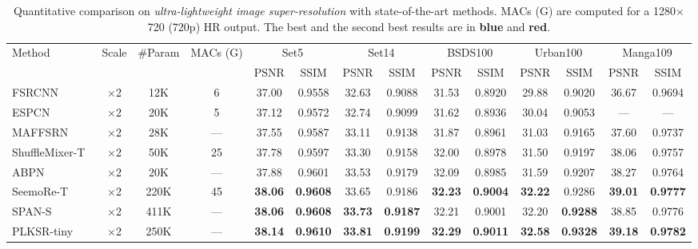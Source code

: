 \documentclass[10pt,twocolumn]{article}
\newcommand{\best}[1]{\textcolor{bestblue}{\textbf{#1}}}
\newcommand{\second}[1]{\textcolor{secondred}{\textbf{#1}}}
\begin{document}
\begin{table}[t]
\centering
\caption{Quantitative comparison on \textit{ultra-lightweight image super-resolution} with state-of-the-art methods.
MACs (G) are computed for a 1280$\times$720 (720p) HR output.
The best and the second best results are in \textcolor{bestblue}{\textbf{blue}} and \textcolor{secondred}{\textbf{red}}.}
\label{tab:sr_comparison}
\setlength{\tabcolsep}{2.5pt}
\footnotesize
\begin{tabular}{lcc c cc cc cc cc cc}
\toprule
\multirow{2}{*}{Method} & \multirow{2}{*}{Scale} & \multirow{2}{*}{\#Param}
  & \multirow{2}{*}{MACs (G)}
  & \multicolumn{2}{c}{Set5}
  & \multicolumn{2}{c}{Set14}
  & \multicolumn{2}{c}{BSDS100}
  & \multicolumn{2}{c}{Urban100}
  & \multicolumn{2}{c}{Manga109} \\
\cmidrule(lr){5-6}\cmidrule(lr){7-8}\cmidrule(lr){9-10}\cmidrule(lr){11-12}\cmidrule(lr){13-14}
 & & & & PSNR & SSIM & PSNR & SSIM & PSNR & SSIM & PSNR & SSIM & PSNR & SSIM \\
\midrule
FSRCNN~\cite{dong2016accelerating}
  & $\times$2 & 12K & 6
  & 37.00 & 0.9558 & 32.63 & 0.9088 & 31.53 & 0.8920 & 29.88 & 0.9020 & 36.67 & 0.9694 \\
ESPCN~\cite{shi2016real}
  & $\times$2 & 20K & 5
  & 37.12 & 0.9572 & 32.74 & 0.9099 & 31.62 & 0.8936 & 30.04 & 0.9053 & ---   & ---    \\
MAFFSRN~\cite{muqeet2020multi}
  & $\times$2 & 28K & ---
  & 37.55 & 0.9587 & 33.11 & 0.9138 & 31.87 & 0.8961 & 31.03 & 0.9165 & 37.60 & 0.9737 \\
ShuffleMixer-T~\cite{sun2023shufflemixer}
  & $\times$2 & 50K & 25
  & 37.78 & 0.9597 & 33.30 & 0.9158 & 32.00 & 0.8978 & 31.50 & 0.9197 & 38.06 & 0.9757 \\
ABPN~\cite{du2021anchor}
  & $\times$2 & 20K & ---
  & 37.88 & 0.9601 & 33.53 & 0.9179 & 32.09 & 0.8985 & 31.59 & 0.9207 & 38.27 & 0.9764 \\
SeemoRe-T~\cite{zamfir2024see}
  & $\times$2 & 220K & 45
  & \second{38.06} & \second{0.9608} & 33.65 & 0.9186 & \second{32.23} & \second{0.9004} & \second{32.22} & 0.9286 & \second{39.01} & \second{0.9777} \\
SPAN-S~\cite{wan2024swift}
  & $\times$2 & 411K & ---
  & \second{38.06} & \second{0.9608} & \second{33.73} & \second{0.9187} & 32.21 & 0.9001 & 32.20 & \second{0.9288} & 38.85 & 0.9776 \\
PLKSR-tiny~\cite{lee2024plksr}
  & $\times$2 & 250K & ---
  & \best{38.14} & \best{0.9610} & \best{33.81} & \best{0.9199} & \best{32.29} & \best{0.9011} & \best{32.58} & \best{0.9328} & \best{39.18} & \best{0.9782} \\

\end{tabular}
\end{table}
\end{document}
